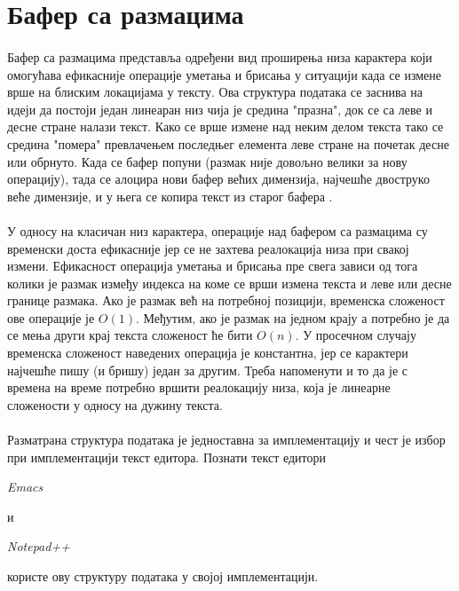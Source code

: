 \documentclass[12pt,oneside]{memoir}
\begin{document}
\section{Бафер са размацима}
\paragraph{}
Бафер са размацима представља одређени вид проширења низа карактера који омогућава
ефикасније операције уметања и брисања у ситуацији када се измене врше на блиским
локацијама у тексту. Ова структура података се заснива на идеји да постоји један линеаран низ чија је средина "празна", док се са леве и десне стране налази текст.
Како се врше измене над неким делом текста тако се средина "помера" превлачењем последњег елемента леве стране на почетак десне или обрнуто. Када се бафер попуни (размак није довољно велики за нову операцију), тада се алоцира нови бафер већих димензија, најчешће двоструко веће димензије, и у њега се копира текст из старог бафера \cite{GapBuffer}. 

\paragraph{}
У односу на класичан низ карактера, операције над бафером са размацима су временски доста ефикасније јер се не захтева реалокација низа при свакој измени. Ефикасност операција уметања и брисања пре свега зависи од тога колики је размак између индекса на коме се  
врши измена текста и леве или десне границе размака. Ако је размак већ на потребној позицији, временска сложеност ове операције је \(O(1)\). Међутим, ако је размак на једном крају а
потребно је да се мења други крај текста сложеност ће бити \(O(n)\). У просечном случају
временска сложеност наведених операција је константна, јер се карактери најчешће пишу (и бришу) један за другим. Треба напоменути и то да је с времена на време потребно вршити
реалокацију низа, која је линеарне сложености у односу на дужину текста.

\paragraph{}
Разматрана структура података је једноставна за имплементацију и чест је избор
при имплементацији текст едитора. Познати текст едитори \begin{latinica}\textit{Emacs}\end{latinica} \cite{Emacs} и 
\begin{latinica}\textit{Notepad++}\end{latinica} \cite{Notepad++}
користе ову структуру података у својој имплементацији.
\end{document}
